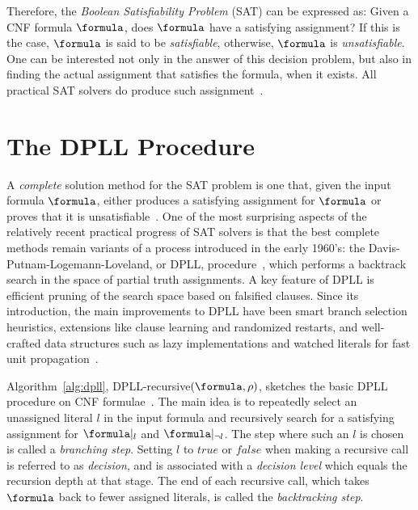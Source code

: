 Therefore, the \emph{Boolean Satisfiability Problem} (SAT) can be expressed as:
Given a CNF formula $\formula$, does $\formula$ have a satisfying assignment? If
this is the case, $\formula$ is said to be \emph{satisfiable}, otherwise,
$\formula$ is \emph{unsatisfiable}.  One can be interested not only in the
answer of this decision problem, but also in finding the actual assignment that
satisfies the formula, when it exists. All practical SAT solvers do produce such
assignment~\cite{cormen}. 

\section{The DPLL Procedure}
\label{sec:dpll}

A \emph{complete} solution method for the SAT problem is one that, given the
input formula $\formula$, either produces a satisfying assignment for $\formula$
or proves that it is unsatisfiable~\cite{satchapter}. One of the most surprising
aspects of the relatively recent practical progress of SAT solvers is that the
best complete methods remain variants of a process introduced in the early
1960’s: the Davis-Putnam-Logemann-Loveland, or DPLL,
procedure~\cite{DavisLongemannLoveland:1962}, which performs a backtrack search
in the space of partial truth assignments. A key feature of DPLL is efficient
pruning of the search space based on falsified clauses. Since its introduction,
the main improvements to DPLL have been smart branch selection heuristics,
extensions like clause learning and randomized restarts, and well-crafted data
structures such as lazy implementations and watched literals for fast unit
propagation~\cite{satchapter}.

Algorithm~\ref{alg:dpll}, DPLL-recursive$(\formula, \rho)$, sketches the basic
DPLL procedure on CNF formulae~\cite{DavisLongemannLoveland:1962}. The main idea
is to repeatedly select an unassigned literal $l$ in the input formula and
recursively search for a satisfying assignment for $\formula|_l$ and
$\formula|_{\neg l}$. The step where such an $l$ is chosen is called a
\emph{branching step}. Setting $l$ to $true$ or $false$ when making a recursive call
is referred to as \emph{decision}, and is associated with a \emph{decision
level} which equals the recursion depth at that stage. The end of each recursive
call, which takes $\formula$ back to fewer assigned literals, is called the
\emph{backtracking step}.

